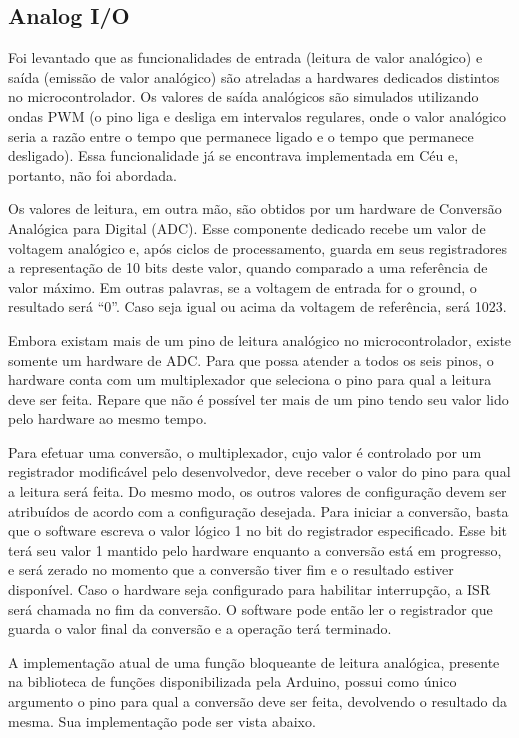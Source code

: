 \documentclass[11pt]{article}
\begin{document}
\subsection{Analog I/O}
\tab Foi levantado que as funcionalidades de entrada (leitura de valor analógico) e saída (emissão de valor analógico) são atreladas a hardwares dedicados distintos no microcontrolador. Os valores de saída analógicos são simulados utilizando ondas PWM (o pino liga e desliga em intervalos regulares, onde o valor analógico seria a razão entre o tempo que permanece ligado e o tempo que permanece desligado). Essa funcionalidade já se encontrava implementada em Céu e, portanto, não foi abordada.
\par Os valores de leitura, em outra mão, são obtidos por um hardware de Conversão Analógica para Digital (ADC). Esse componente dedicado recebe um valor de voltagem analógico e, após ciclos de processamento, guarda em seus registradores a representação de 10 bits deste valor, quando comparado a uma referência de valor máximo. Em outras palavras, se a voltagem de entrada for o ground, o resultado será “0”. Caso seja igual ou acima da voltagem de referência, será 1023. 
\par Embora existam mais de um pino de leitura analógico no microcontrolador, existe somente um hardware de ADC. Para que possa atender a todos os seis pinos, o hardware conta com um multiplexador que seleciona o pino para qual a leitura deve ser feita. Repare que não é possível ter mais de um pino tendo seu valor lido pelo hardware ao mesmo tempo. 
\par Para efetuar uma conversão, o multiplexador, cujo valor é controlado por um registrador modificável pelo desenvolvedor, deve receber o valor do pino para qual a leitura será feita. Do mesmo modo, os outros valores de configuração devem ser atribuídos de acordo com a configuração desejada. Para iniciar a conversão, basta que o software escreva o valor lógico 1 no bit do registrador especificado. Esse bit terá seu valor 1 mantido pelo hardware enquanto a conversão está em progresso, e será zerado no momento que a conversão tiver fim e o resultado estiver disponível. Caso o hardware seja configurado para habilitar interrupção, a ISR será chamada no fim da conversão. O software pode então ler o registrador que guarda o valor final da conversão e a operação terá terminado.
\par A implementação atual de uma função bloqueante de leitura analógica, presente na biblioteca de funções disponibilizada pela Arduino, possui como único argumento o pino para qual a conversão deve ser feita, devolvendo o resultado da mesma. Sua implementação pode ser vista abaixo.
\end{document}
